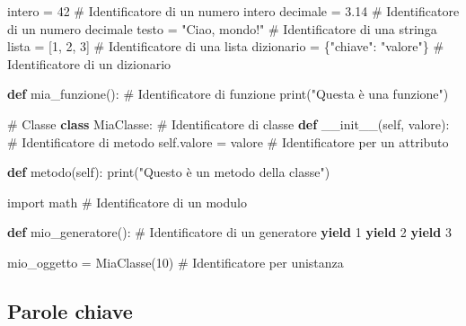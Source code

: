 \documentclass[
  letterpaper,
  DIV=11,
  numbers=noendperiod]{scrreprt}
\newenvironment{Shaded}{\begin{snugshade}}{\end{snugshade}}
\newcommand{\BuiltInTok}[1]{\textcolor[rgb]{0.00,0.23,0.31}{#1}}
\newcommand{\CommentTok}[1]{\textcolor[rgb]{0.37,0.37,0.37}{#1}}
\newcommand{\ControlFlowTok}[1]{\textcolor[rgb]{0.00,0.23,0.31}{\textbf{#1}}}
\newcommand{\DecValTok}[1]{\textcolor[rgb]{0.68,0.00,0.00}{#1}}
\newcommand{\FloatTok}[1]{\textcolor[rgb]{0.68,0.00,0.00}{#1}}
\newcommand{\FunctionTok}[1]{\textcolor[rgb]{0.28,0.35,0.67}{#1}}
\newcommand{\ImportTok}[1]{\textcolor[rgb]{0.00,0.46,0.62}{#1}}
\newcommand{\KeywordTok}[1]{\textcolor[rgb]{0.00,0.23,0.31}{\textbf{#1}}}
\newcommand{\NormalTok}[1]{\textcolor[rgb]{0.00,0.23,0.31}{#1}}
\newcommand{\OperatorTok}[1]{\textcolor[rgb]{0.37,0.37,0.37}{#1}}
\newcommand{\StringTok}[1]{\textcolor[rgb]{0.13,0.47,0.30}{#1}}
\newcommand{\VariableTok}[1]{\textcolor[rgb]{0.07,0.07,0.07}{#1}}
\begin{document}
\begin{Shaded}
\begin{Highlighting}[]
\NormalTok{intero }\OperatorTok{=} \DecValTok{42}  \CommentTok{\# Identificatore di un numero intero}
\NormalTok{decimale }\OperatorTok{=} \FloatTok{3.14}  \CommentTok{\# Identificatore di un numero decimale}
\NormalTok{testo }\OperatorTok{=} \StringTok{"Ciao, mondo!"}  \CommentTok{\# Identificatore di una stringa}
\NormalTok{lista }\OperatorTok{=}\NormalTok{ [}\DecValTok{1}\NormalTok{, }\DecValTok{2}\NormalTok{, }\DecValTok{3}\NormalTok{]  }\CommentTok{\# Identificatore di una lista}
\NormalTok{dizionario }\OperatorTok{=}\NormalTok{ \{}\StringTok{"chiave"}\NormalTok{: }\StringTok{"valore"}\NormalTok{\}  }\CommentTok{\# Identificatore di un dizionario}

\KeywordTok{def}\NormalTok{ mia\_funzione(): }\CommentTok{\# Identificatore di funzione}
    \BuiltInTok{print}\NormalTok{(}\StringTok{"Questa è una funzione"}\NormalTok{)}

\CommentTok{\# Classe}
\KeywordTok{class}\NormalTok{ MiaClasse: }\CommentTok{\# Identificatore di classe}
    \KeywordTok{def} \FunctionTok{\_\_init\_\_}\NormalTok{(}\VariableTok{self}\NormalTok{, valore): }\CommentTok{\# Identificatore di metodo}
        \VariableTok{self}\NormalTok{.valore }\OperatorTok{=}\NormalTok{ valore  }\CommentTok{\# Identificatore per un attributo}
    
    \KeywordTok{def}\NormalTok{ metodo(}\VariableTok{self}\NormalTok{):}
        \BuiltInTok{print}\NormalTok{(}\StringTok{"Questo è un metodo della classe"}\NormalTok{)}

\ImportTok{import}\NormalTok{ math  }\CommentTok{\# Identificatore di un modulo}

\KeywordTok{def}\NormalTok{ mio\_generatore(): }\CommentTok{\# Identificatore di un generatore}
    \ControlFlowTok{yield} \DecValTok{1}
    \ControlFlowTok{yield} \DecValTok{2}
    \ControlFlowTok{yield} \DecValTok{3}

\NormalTok{mio\_oggetto }\OperatorTok{=}\NormalTok{ MiaClasse(}\DecValTok{10}\NormalTok{)  }\CommentTok{\# Identificatore per un\textquotesingle{}istanza}
\end{Highlighting}
\end{Shaded}

\subsection{Parole chiave}\label{parole-chiave}
\end{document}
